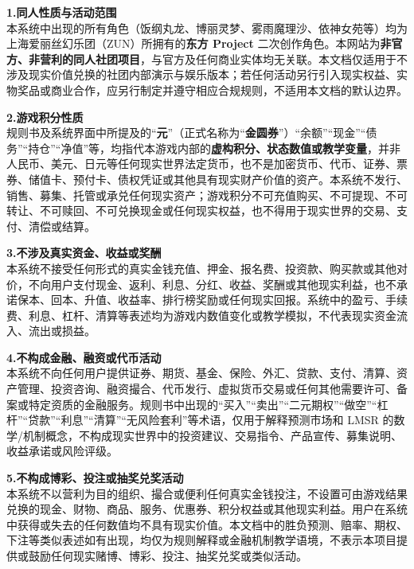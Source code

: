 \documentclass[11pt,a4paper,twoside]{article}
\begin{document}
\vspace{0.4em}
\noindent\makebox[\linewidth][c]{\textcolor{rule}{\rule{0.62\linewidth}{0.4pt}}}
\vspace{0.4em}

\textbf{1.\;同人性质与活动范围}\\
本系统中出现的所有角色（饭纲丸龙、博丽灵梦、雾雨魔理沙、依神女苑等）均为上海爱丽丝幻乐团（ZUN）所拥有的\textbf{东方 Project} 二次创作角色。本网站为\textbf{非官方、非营利的同人社团项目}，与官方及任何商业实体均无关联。本文档仅适用于不涉及现实价值兑换的社团内部演示与娱乐版本；若任何活动另行引入现实权益、实物奖品或商业合作，应另行制定并遵守相应合规规则，不适用本文档的默认边界。

\textbf{2.\;游戏积分性质}\\
规则书及系统界面中所提及的“\textbf{元}”（正式名称为“\textbf{金圆券}”）“余额”“现金”“债务”“持仓”“净值”等，均指代本游戏内部的\textbf{虚构积分、状态数值或教学变量}，并非人民币、美元、日元等任何现实世界法定货币，也不是加密货币、代币、证券、票券、储值卡、预付卡、债权凭证或其他具有现实财产价值的资产。本系统不发行、销售、募集、托管或承兑任何现实资产；游戏积分不可充值购买、不可提现、不可转让、不可赎回、不可兑换现金或任何现实权益，也不得用于现实世界的交易、支付、清偿或结算。

\textbf{3.\;不涉及真实资金、收益或奖酬}\\
本系统不接受任何形式的真实金钱充值、押金、报名费、投资款、购买款或其他对价，不向用户支付现金、返利、利息、分红、收益、奖酬或其他现实利益，也不承诺保本、回本、升值、收益率、排行榜奖励或任何现实回报。系统中的盈亏、手续费、利息、杠杆、清算等表述均为游戏内数值变化或教学模拟，不代表现实资金流入、流出或损益。

\textbf{4.\;不构成金融、融资或代币活动}\\
本系统不向任何用户提供证券、期货、基金、保险、外汇、贷款、支付、清算、资产管理、投资咨询、融资撮合、代币发行、虚拟货币交易或任何其他需要许可、备案或特定资质的金融服务。规则书中出现的“买入”“卖出”“二元期权”“做空”“杠杆”“贷款”“利息”“清算”“无风险套利”等术语，仅用于解释预测市场和 LMSR 的数学/机制概念，不构成现实世界中的投资建议、交易指令、产品宣传、募集说明、收益承诺或风险评级。

\textbf{5.\;不构成博彩、投注或抽奖兑奖活动}\\
本系统不以营利为目的组织、撮合或便利任何真实金钱投注，不设置可由游戏结果兑换的现金、财物、商品、服务、优惠券、积分权益或其他现实利益。用户在系统中获得或失去的任何数值均不具有现实价值。本文档中的胜负预测、赔率、期权、下注等类似表述如有出现，均仅为规则解释或金融机制教学语境，不表示本项目提供或鼓励任何现实赌博、博彩、投注、抽奖兑奖或类似活动。
\end{document}

